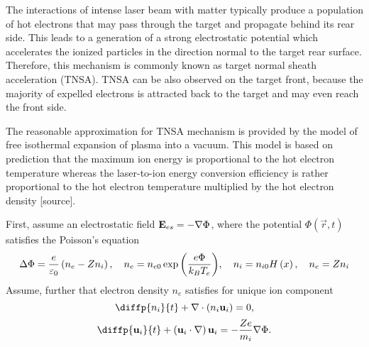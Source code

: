 The interactions of intense laser beam with matter typically produce a population of hot electrons that may pass through the target and propagate behind its rear side. This leads to a generation of a strong electrostatic potential which accelerates the ionized particles in the direction normal to the target rear surface. Therefore, this mechanism is commonly known as target normal sheath acceleration (TNSA). TNSA can be also observed on the target front, because the majority of expelled electrons is attracted back to the target and may even reach the front side.

The reasonable approximation for TNSA mechanism is provided by the model of free isothermal expansion of plasma into a vacuum. This model is based on prediction that the maximum ion energy is proportional to the hot electron temperature whereas the laser-to-ion energy conversion efficiency is rather proportional to the hot electron temperature multiplied by the hot electron density [source].

First, assume an electrostatic field $ \mathbf{E}_{es} = -\nabla \Phi $, where the potential $ \Phi \left(\vec{r}, t \right) $ satisfies the Poisson's equation 
\begin{equation}
\Delta \Phi = \frac{e}{\varepsilon_0} \left(n_e - Z n_i \right), \quad n_e = n_{e0} \exp{\left( \frac{e \Phi}{k_B T_e} \right)}, \quad n_i = n_{i0} H\left(x \right), \quad n_e = Z n_i
\end{equation}
Assume, further that electron density $ n_e $ satisfies 
for unique ion component 
\begin{equation}
\diffp{n_i}{t} + \div{\left(n_i \vec{u}_i\right)} = 0,
\end{equation}
\begin{equation}
\diffp{\vec{u}_i}{t} + \left(\vec{u}_i \cdot \grad{} \right) \vec{u}_i = - \frac{Z e}{m_i} \grad{\Phi}. 
\end{equation}


